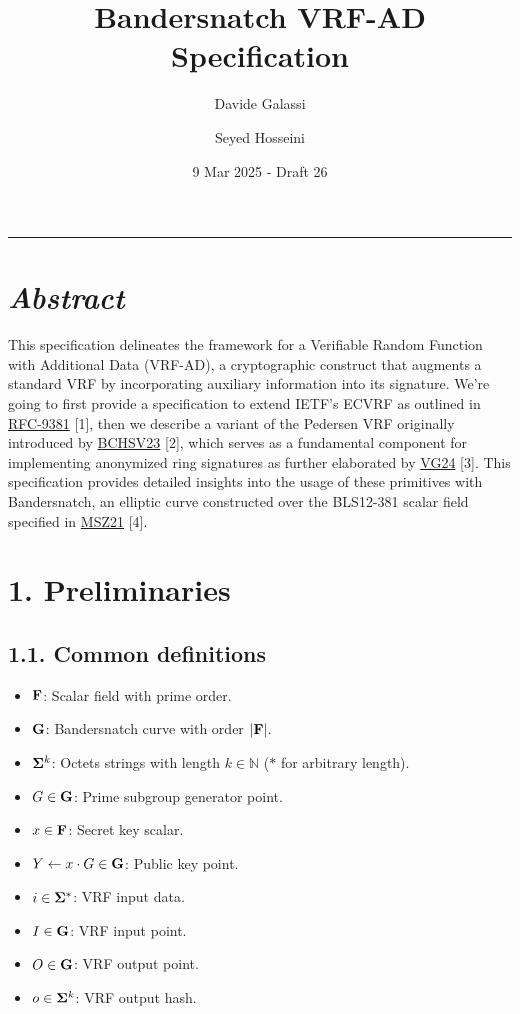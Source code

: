 \documentclass[
]{article}
\title{Bandersnatch VRF-AD Specification}
\author{Davide Galassi \and Seyed Hosseini}
\date{9 Mar 2025 - Draft 26}
\begin{document}
\maketitle

\newcommand{\G}{\bold{G}}
\newcommand{\F}{\bold{F}}
\newcommand{\S}{\bold{\Sigma}}

\begin{center}\rule{0.5\linewidth}{0.5pt}\end{center}

\section{\texorpdfstring{\emph{Abstract}}{Abstract}}\label{abstract}

This specification delineates the framework for a Verifiable Random
Function with Additional Data (VRF-AD), a cryptographic construct that
augments a standard VRF by incorporating auxiliary information into its
signature. We're going to first provide a specification to extend IETF's
ECVRF as outlined in
\href{https://datatracker.ietf.org/doc/rfc9381}{RFC-9381} {[}1{]}, then
we describe a variant of the Pedersen VRF originally introduced by
\href{https://eprint.iacr.org/2023/002}{BCHSV23} {[}2{]}, which serves
as a fundamental component for implementing anonymized ring signatures
as further elaborated by
\href{https://github.com/davxy/ring-proof-spec}{VG24} {[}3{]}. This
specification provides detailed insights into the usage of these
primitives with Bandersnatch, an elliptic curve constructed over the
BLS12-381 scalar field specified in
\href{https://eprint.iacr.org/2021/1152}{MSZ21} {[}4{]}.

\section{1. Preliminaries}\label{preliminaries}

\subsection{1.1. Common definitions}\label{common-definitions}

\begin{itemize}
\item
  \(\bold{F}\): Scalar field with prime order.
\item
  \(\bold{G}\): Bandersnatch curve with order \(|\bold{F}|\).
\item
  \(\bold{\Sigma}^k\): Octets strings with length \(k \in \mathbb{N}\)
  (\(*\) for arbitrary length).
\item
  \(G \in \bold{G}\): Prime subgroup generator point.
\item
  \(x \in \bold{F}\): Secret key scalar.
\item
  \(Y \gets x \cdot G \in \bold{G}\): Public key point.
\item
  \(i \in \bold{\Sigma}^*\): VRF input data.
\item
  \(I \in \bold{G}\): VRF input point.
\item
  \(O \in \bold{G}\): VRF output point.
\item
  \(o \in \bold{\Sigma}^k\): VRF output hash.
\end{itemize}
\end{document}
